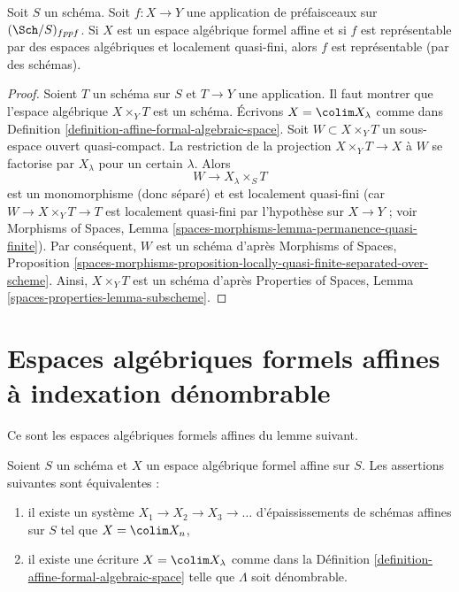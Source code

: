 \begin{lemma}
\label{lemma-presentation-representable}
Soit $S$ un schéma. Soit $f : X \to Y$ une application
de préfaisceaux sur $(\Sch/S)_{fppf}$. Si $X$ est un espace algébrique formel
affine et si $f$ est représentable par des espaces algébriques et localement quasi-fini,
alors $f$ est représentable (par des schémas).
\end{lemma}

\begin{proof}
Soient $T$ un schéma sur $S$ et $T \to Y$ une application. Il faut montrer que
l'espace algébrique $X \times_Y T$ est un schéma. Écrivons $X = \colim X_\lambda$
comme dans Definition
\ref{definition-affine-formal-algebraic-space}.
Soit $W \subset X \times_Y T$
un sous-espace ouvert quasi-compact. La restriction de la projection
$X \times_Y T \to X$ à $W$ se factorise par $X_\lambda$ pour un certain $\lambda$.
Alors
$$
W \to X_\lambda \times_S T
$$
est un monomorphisme (donc séparé) et est localement quasi-fini (car
$W \to X \times_Y T \to T$ est localement quasi-fini par l'hypothèse
sur $X \to Y$ ; voir Morphisms of Spaces, Lemma
\ref{spaces-morphisms-lemma-permanence-quasi-finite}).
Par conséquent, $W$ est un schéma d'après
Morphisms of Spaces, Proposition
\ref{spaces-morphisms-proposition-locally-quasi-finite-separated-over-scheme}.
Ainsi, $X \times_Y T$ est un schéma d'après
Properties of Spaces, Lemma \ref{spaces-properties-lemma-subscheme}.
\end{proof}






\section{Espaces algébriques formels affines à indexation dénombrable}
\label{section-countably-indexed}

\noindent
Ce sont les espaces algébriques formels affines du lemme suivant.

\begin{lemma}
\label{lemma-countable-affine-formal-algebraic-space}
Soient $S$ un schéma et $X$ un espace algébrique formel affine sur $S$.
Les assertions suivantes sont équivalentes :
\begin{enumerate}
\item il existe un système $X_1 \to X_2 \to X_3 \to \ldots$
d'épaississements de schémas affines sur $S$ tel que $X = \colim X_n$,
\item il existe une écriture $X = \colim X_\lambda$ comme dans la
Définition \ref{definition-affine-formal-algebraic-space}
telle que $\Lambda$ soit dénombrable.
\end{enumerate}
\end{lemma}

